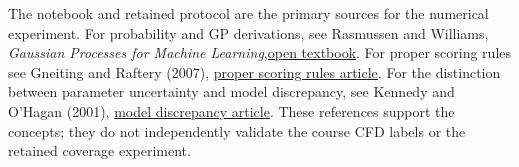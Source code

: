 \documentclass[11pt]{article}
\begin{document}
The notebook and retained protocol are the primary sources for the numerical
experiment. For probability and GP derivations, see Rasmussen and Williams,
\emph{Gaussian Processes for Machine Learning},\href{https://gaussianprocess.org/gpml/}{open textbook}.
For proper scoring rules see Gneiting and Raftery (2007),
\href{https://doi.org/10.1198/016214506000001437}{proper scoring rules article}.
For the distinction between parameter uncertainty and model discrepancy, see
Kennedy and O'Hagan (2001),
\href{https://doi.org/10.1111/1467-9868.00294}{model discrepancy article}.
These references support the concepts; they do not independently validate the
course CFD labels or the retained coverage experiment.
\end{document}

